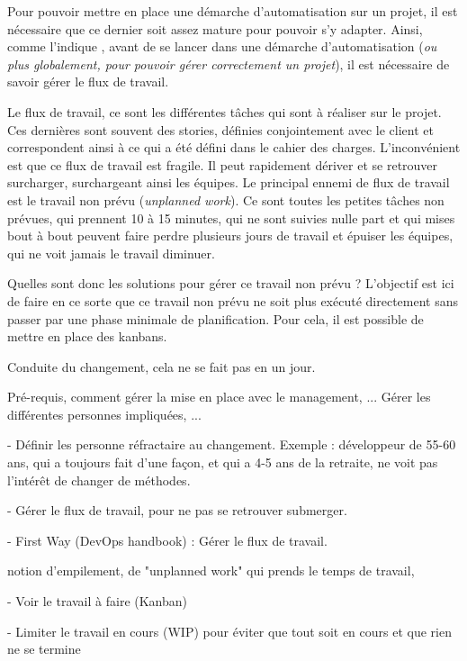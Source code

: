 Pour pouvoir mettre en place une démarche d'automatisation sur un projet, il est nécessaire que ce dernier soit assez mature pour pouvoir s'y adapter. Ainsi, comme l'indique  \cite{phoenixProject},  avant de se lancer dans une démarche d'automatisation (\emph{ou plus globalement, pour pouvoir gérer correctement un projet}), il est nécessaire de savoir gérer le flux de travail.

Le flux de travail, ce sont les différentes tâches qui sont à réaliser sur le projet. Ces dernières sont souvent des stories, définies conjointement avec le client et correspondent ainsi à ce qui a été défini dans le cahier des charges. L'inconvénient est que ce flux de travail est fragile. Il peut rapidement dériver et se retrouver surcharger, surchargeant ainsi les équipes. Le principal ennemi de flux de travail est le travail non prévu (\emph{unplanned work}). Ce sont toutes les petites tâches non prévues, qui prennent 10 à 15 minutes, qui ne sont suivies nulle part et qui mises bout à bout peuvent faire perdre plusieurs jours de travail et épuiser les équipes, qui ne voit jamais le travail diminuer.

Quelles sont donc les solutions pour gérer ce travail non prévu ? L'objectif est ici de faire en ce sorte que ce travail non prévu ne soit plus exécuté directement sans passer par une phase minimale de planification. Pour cela, il est possible de mettre en place des kanbans.


Conduite du changement, cela ne se fait pas en un jour.

Pré-requis, comment gérer la mise en place avec le management, ... Gérer les différentes personnes impliquées, ...

- Définir les personne réfractaire au changement. Exemple : développeur de 55-60 ans, qui a toujours fait d'une façon, et qui a 4-5 ans de la retraite, ne voit pas l'intérêt de changer de méthodes.

- Gérer le flux de travail, pour ne pas se retrouver submerger.

- First Way (DevOps handbook) : Gérer le flux de travail. 

notion d'empilement, de "unplanned work" qui prends le temps de travail,

- Voir le travail à faire (Kanban)

- Limiter le travail en cours (WIP) pour éviter que tout soit en cours et que rien ne se termine

